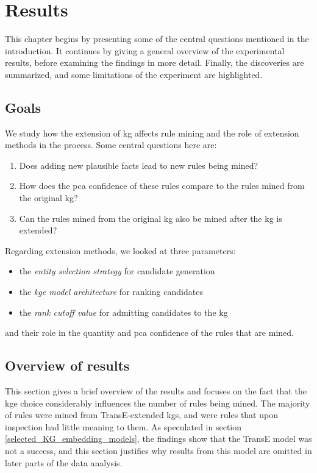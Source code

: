 \chapter{Results}
This chapter begins by presenting some of the central questions mentioned in the introduction. It continues by giving a general overview of the experimental results, before examining the findings in more detail. Finally, the discoveries are summarized, and some limitations of the experiment are highlighted.

\section{Goals}
We study how the extension of \gls{kg} affects rule mining and the role of extension methods in the process. Some central questions here are:
\begin{enumerate}
    \item Does adding new plausible facts lead to new rules being mined? 
    \item How does the \gls{pca} confidence of these rules compare to the rules mined from the original \gls{kg}?
    \item Can the rules mined from the original \gls{kg} also be mined after the \gls{kg} is extended?
\end{enumerate}
Regarding extension methods, we looked at three parameters:
\begin{itemize}
    \item the \textit{entity selection strategy} for candidate generation
    \item the \textit{\gls{kge} model architecture} for ranking candidates
    \item the \textit{rank cutoff value} for admitting candidates to the \gls{kg}
\end{itemize}
and their role in the quantity and \gls{pca} confidence of the rules that are mined.

\section{Overview of results}
This section gives a brief overview of the results and focuses on the fact that the \gls{kge} choice considerably influences the number of rules being mined. The majority of rules were mined from TransE-extended \glspl{kg}, and were rules that upon inspection had little meaning to them. As speculated in section \ref{selected_KG_embedding_models}, the findings show that the TransE model was not a success, and this section justifies why results from this model are omitted in later parts of the data analysis.

